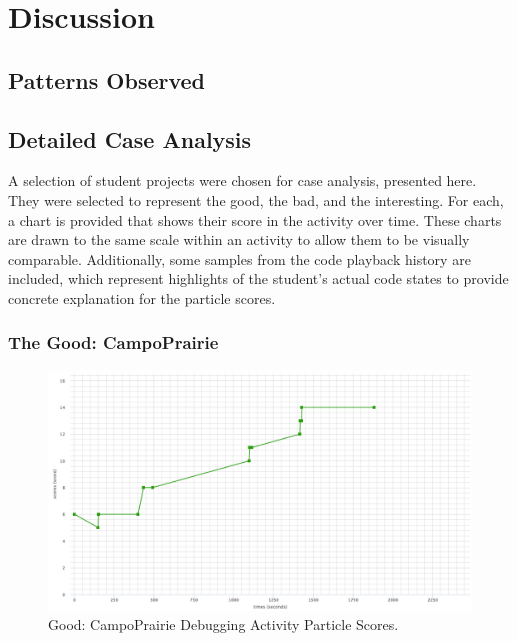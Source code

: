 \chapter{Discussion}


\section{Patterns Observed}
\label{sec:patterns}



\section{Detailed Case Analysis}
\label{sec:case_analysis}
A selection of student projects were chosen for case analysis, presented here. They were selected to represent the good, the bad, and the interesting. For each, a chart is provided that shows their score in the activity over time. These charts are drawn to the same scale within an activity to allow them to be visually comparable. Additionally, some samples from the code playback history are included, which represent highlights of the student's actual code states to provide concrete explanation for the particle scores.

\subsection{The Good: CampoPrairie}
\begin{figure}
	\centering
	\includegraphics[width=\textwidth]{images/stories/scores-debug-CampoPrairie}
	\caption[Good: CampoPrairie Debugging Activity Particle Scores]{Good: CampoPrairie Debugging Activity Particle Scores.}
	\label{fig:CampoPrairie_chart}
\end{figure}

